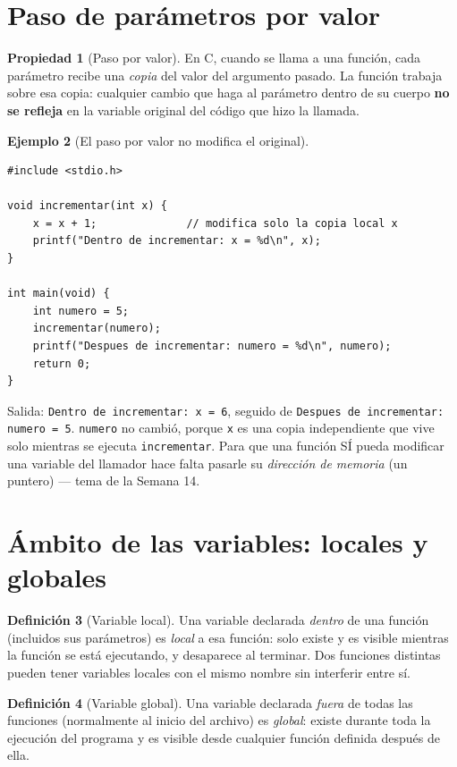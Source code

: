 \documentclass[11pt,letterpaper]{article}
\theoremstyle{definition}
\newtheorem{definicion}{Definición}[section]
\newtheorem{ejemplo}[definicion]{Ejemplo}
\newtheorem{propiedad}[definicion]{Propiedad}
\begin{document}
\section{Paso de parámetros por valor}

\begin{propiedad}[Paso por valor]
En C, cuando se llama a una función, cada parámetro recibe una \emph{copia} del valor del
argumento pasado. La función trabaja sobre esa copia: cualquier cambio que haga al parámetro
dentro de su cuerpo \textbf{no se refleja} en la variable original del código que hizo la llamada.
\end{propiedad}

\begin{ejemplo}[El paso por valor no modifica el original]
\begin{lstlisting}
#include <stdio.h>

void incrementar(int x) {
    x = x + 1;              // modifica solo la copia local x
    printf("Dentro de incrementar: x = %d\n", x);
}

int main(void) {
    int numero = 5;
    incrementar(numero);
    printf("Despues de incrementar: numero = %d\n", numero);
    return 0;
}
\end{lstlisting}
Salida: \texttt{Dentro de incrementar: x = 6}, seguido de \texttt{Despues de incrementar: numero
= 5}. \texttt{numero} no cambió, porque \texttt{x} es una copia independiente que vive solo
mientras se ejecuta \texttt{incrementar}. Para que una función SÍ pueda modificar una variable del
llamador hace falta pasarle su \emph{dirección de memoria} (un puntero) --- tema de la Semana 14.
\end{ejemplo}

\section{Ámbito de las variables: locales y globales}

\begin{definicion}[Variable local]
Una variable declarada \emph{dentro} de una función (incluidos sus parámetros) es \emph{local} a
esa función: solo existe y es visible mientras la función se está ejecutando, y desaparece al
terminar. Dos funciones distintas pueden tener variables locales con el mismo nombre sin
interferir entre sí.
\end{definicion}

\begin{definicion}[Variable global]
Una variable declarada \emph{fuera} de todas las funciones (normalmente al inicio del archivo) es
\emph{global}: existe durante toda la ejecución del programa y es visible desde cualquier función
definida después de ella.
\end{definicion}
\end{document}
